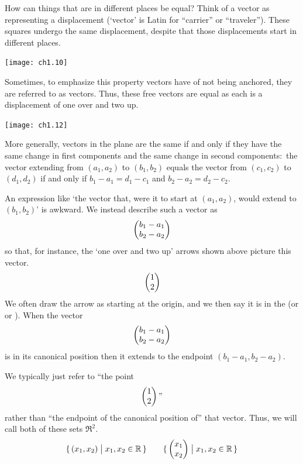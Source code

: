 How can things that are in different places be equal?
Think of a vector as representing a displacement
(`vector' is Latin for ``carrier'' or ``traveler'').
These squares undergo the same displacement,
despite that those displacements start in different places. 
\begin{center}
  \texttt{[image: ch1.10]}
\end{center}
Sometimes, to emphasize this property vectors have of not being anchored,
they are referred to as  vectors.
Thus, these free vectors are equal
as each is a displacement of one over and two up.
\begin{center}
  \texttt{[image: ch1.12]}
\end{center}
More generally, vectors in the plane 
are the same if and only if they have the same
change in first components and the same change in second components:~the
vector extending from \( (a_1,a_2) \)
to \( (b_1,b_2) \) equals the vector from 
\( (c_1,c_2) \) to \( (d_1,d_2) \)
if and only if 
\( b_1-a_1=d_1-c_1 \) and \( b_2-a_2=d_2-c_2 \).

An expression like `the vector that, were it to start at \( (a_1,a_2) \),
would extend to \( (b_1,b_2) \)' is awkward.
We instead describe such a vector as
\begin{equation*}
  \begin{pmatrix} b_1-a_1 \\ b_2-a_2 \end{pmatrix}
\end{equation*}
so that, for instance, the `one over and two up' arrows shown above 
picture this vector.
\begin{equation*}
  \begin{pmatrix} 1 \\ 2 \end{pmatrix}
\end{equation*}
We often draw the arrow as starting at the origin, and we
then say it is in the 
(or  
or ). 
When the vector
\begin{equation*}
  \begin{pmatrix} b_1-a_1 \\ b_2-a_2 \end{pmatrix}
\end{equation*}
is in its canonical position then it
extends to the endpoint $(b_1-a_1,b_2-a_2)$.

We typically just refer to ``the point
\begin{equation*}
  \begin{pmatrix} 1 \\ 2 \end{pmatrix}\text{''}
\end{equation*}
rather than ``the endpoint of the canonical position of'' that vector.
Thus, we will call both of these sets \( \Re^2 \).
\begin{equation*}
   \mbox{$\{\,(x_1,x_2)\bigm| x_1,x_2\in\mathbb{R}\,\}$}
   \qquad
   \mbox{$\{\,\begin{pmatrix} x_1 \\ x_2 \end{pmatrix}\bigm| x_1,x_2\in\mathbb{R}\,\}$}
\end{equation*}

